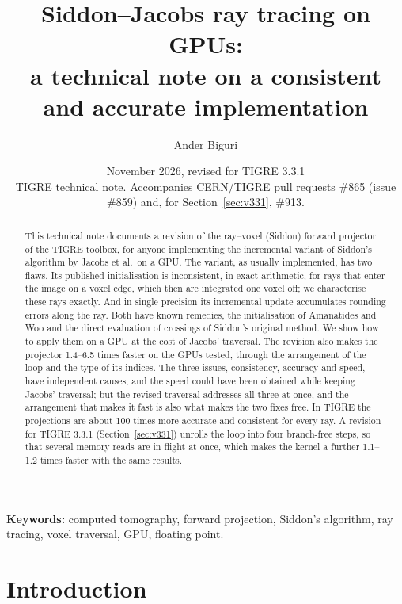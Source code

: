 \documentclass[11pt,a4paper]{article}
\title{Siddon--Jacobs ray tracing on GPUs:\\a technical note on a consistent and accurate implementation}
\author{Ander Biguri}
\affil{Department of Applied Mathematics and Theoretical Physics (DAMTP), University of Cambridge}
\date{November 2026, revised for TIGRE 3.3.1\\[4pt]\small TIGRE technical note. Accompanies CERN/TIGRE pull
requests \#865 (issue \#859) and, for Section~\ref{sec:v331}, \#913.}
\theoremstyle{remark}
\begin{document}
\maketitle

\begin{abstract}
This technical note documents a revision of the ray--voxel (Siddon) forward projector of the TIGRE toolbox,
for anyone implementing the incremental variant of Siddon's algorithm by Jacobs et al.\ on a GPU. The
variant, as usually implemented, has two flaws. Its published initialisation is inconsistent, in exact
arithmetic, for rays that enter the image on a voxel edge, which then are integrated one voxel off; we
characterise these rays exactly. And in single precision its incremental update accumulates rounding errors
along the ray. Both have known remedies, the initialisation of Amanatides and Woo and the direct evaluation
of crossings of Siddon's original method. We show how to apply them on a GPU at the cost of Jacobs'
traversal. The revision also makes the projector 1.4--6.5 times faster on the GPUs tested, through the
arrangement of the loop and the type of its indices. The three issues, consistency, accuracy and speed, have
independent causes, and the speed could have been obtained while keeping Jacobs' traversal; but the revised
traversal addresses all three at once, and the arrangement that makes it fast is also what makes the two fixes
free. In TIGRE the projections are about 100 times more accurate and consistent for every ray. A revision for
TIGRE 3.3.1 (Section~\ref{sec:v331}) unrolls the loop into four branch-free steps, so that several memory
reads are in flight at once, which makes the kernel a further 1.1--1.2 times faster with the same results.
\end{abstract}

\noindent\textbf{Keywords:} computed tomography, forward projection, Siddon's algorithm,
ray tracing, voxel traversal, GPU, floating point.


\section{Introduction}
\end{document}
